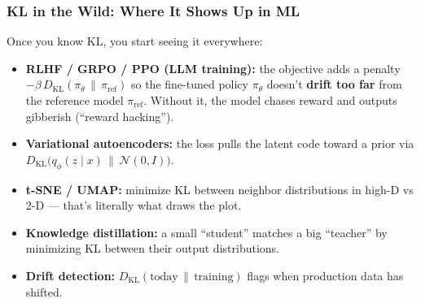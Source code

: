 \documentclass[aspectratio=169]{beamer}
\begin{document}
\begin{frame}
\frametitle{KL in the Wild: Where It Shows Up in ML}

\small
Once you know KL, you start seeing it everywhere:

\begin{itemize}\setlength{\itemsep}{5pt}
  \item \textbf{RLHF / GRPO / PPO (LLM training):} the objective adds a penalty
    $-\beta\, D_{\text{KL}}(\pi_\theta \,\|\, \pi_{\text{ref}})$ so the fine-tuned policy $\pi_\theta$ doesn't \textbf{drift too far} from the reference model $\pi_{\text{ref}}$. Without it, the model chases reward and outputs gibberish (``reward hacking'').
  \item \textbf{Variational autoencoders:} the loss pulls the latent code toward a prior via $D_{\text{KL}}\!\big(q_\phi(z\mid x) \,\|\, \mathcal{N}(0, I)\big)$.
  \item \textbf{t-SNE / UMAP:} minimize KL between neighbor distributions in high-D vs 2-D --- that's literally what draws the plot.
  \item \textbf{Knowledge distillation:} a small ``student'' matches a big ``teacher'' by minimizing KL between their output distributions.
  \item \textbf{Drift detection:} $D_{\text{KL}}(\text{today} \,\|\, \text{training})$ flags when production data has shifted.
\end{itemize}

\vspace{0.05cm}
\begin{center}
\end{center}
\end{frame}
\end{document}
